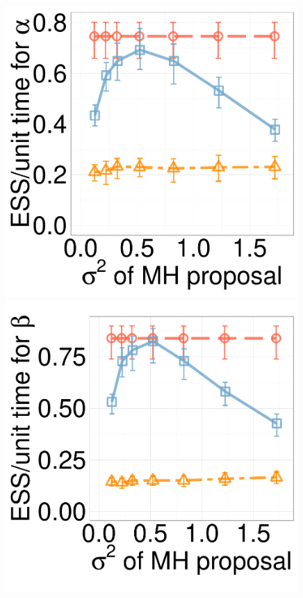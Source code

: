 \begin{figure}[H]
\begin{minipage}[hp]{0.24\linewidth}
	\end{minipage}
  \begin{minipage}[hp]{0.24\linewidth}
  \centering
    \includegraphics [width=0.99\textwidth, angle=0]{figs/new_experiment_figs/q_alpha_dim10_k2.pdf}
	\end{minipage}
  \begin{minipage}[hp]{0.24\linewidth}
  \centering
    \includegraphics [width=0.99\textwidth, angle=0]{figs/new_experiment_figs/q_beta_dim10_k2.pdf}

\end{minipage}
\end{figure}
